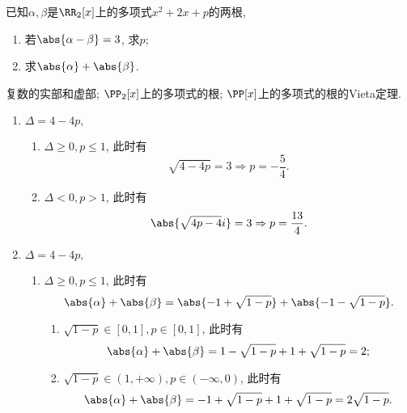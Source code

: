 \documentclass[8pt]{article}
\begin{document}
		\begin{easonbigproblem}
			已知\(\alpha, \beta\)是\(\RR_2[x]\)上的多项式\(x^2 + 2x + p\)的两根,
			\begin{enumerate}[label = \calword{(\arabic*)}]
				\item 若\(\abs{\alpha - \beta} = 3\), 求\(p\);
    			\item 求\(\abs{\alpha} + \abs{\beta}\).
			\end{enumerate}
			\subbigproblem
			 复数的实部和虚部; \(\PP_2[x]\)上的多项式的根; \(\PP[x]\)上的多项式的根的Vieta定理.

			\begin{enumerate}[label = \calword{(\arabic*)}]
				\item 	\(\Delta = 4 - 4p,\)
					\begin{enumerate}[label = \calword{(1.\arabic*)}]
						\item	\(\Delta \geq 0, p \leq 1\), 此时有
							\begin{displaymath}
								\sqrt{4-4p} = 3 \Rightarrow p = -\frac{5}{4}.
							\end{displaymath}
						\item	\(\Delta < 0, p > 1\), 此时有
							\begin{displaymath}
								\abs{\sqrt{4p-4}i} = 3 \Rightarrow p = \frac{13}{4}.
							\end{displaymath}
					\end{enumerate}	
				\item  	\(\Delta = 4 - 4p,\)
					\begin{enumerate}[label = \calword{(2.\arabic*)}]
						\item	\(\Delta \geq 0, p \leq 1\), 此时有
							\begin{displaymath}
								\abs{\alpha} + \abs{\beta} = \abs{-1 + \sqrt{1-p}} + \abs{-1 - \sqrt{1-p}}.
							\end{displaymath}

							\begin{enumerate}[label = \calword{(2.1.\arabic*)}]
								\item \(\sqrt{1-p} \in [0, 1], p \in [0, 1]\), 此时有
								\begin{displaymath}
									\abs{\alpha} + \abs{\beta} = 1 - \sqrt{1-p} + 1 + \sqrt{1-p} = 2;
								\end{displaymath}
								\item \(\sqrt{1-p} \in (1, +\infty), p \in (-\infty, 0)\), 此时有
									\begin{displaymath}
										\abs{\alpha} + \abs{\beta} = -1 + \sqrt{1-p} + 1 + \sqrt{1-p} = 2 \sqrt{1-p}.
									\end{displaymath}
							\end{enumerate}


\end{enumerate}
\end{enumerate}
\end{easonbigproblem}
\end{document}
